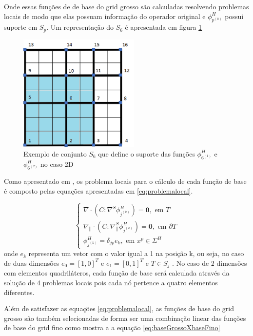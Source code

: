 \documentclass{article}
\begin{document}
Onde essas funções de de base do grid grosso são calculadas resolvendo problemas locais de modo que elas possuam informação do operador original e $\phi^H_{p^{(k)}}$  possui suporte em $S_p$.  Um representação do $S_6$ é apresentada em figura \ref{fig:s6}

\begin{figure}[!htbp]
\label{fig:s6}
\centering
\includegraphics[width=6cm]{figs/S6.png	}
\caption{Exemplo de conjunto $S_6$ que define o suporte das funções  $\phi^H_{6^{(1)}}$ e  $\phi^H_{6^{(2)}}$ no caso 2D}
\end{figure}


Como apresentado em \cite{casteletto}, os problema locais para o cálculo de cada função de base é  composto pelas equações apresentadas em \ref{eq:problemalocal}. 

\begin{equation} \label{eq:problemalocal}
\left\{\begin{matrix}
\nabla \cdotp (C:\nabla ^ S \phi^H_{j^{(k)}}) = \mathbf{0}, \text{   em  } T
\\ 
\nabla_{||} \cdotp (C:\nabla_{||} ^ S \phi^H_{j^{(k)}}) = \mathbf{0}, \text{  em   } \partial T
\\ 
\phi^H_{j^{(k)}} = \delta_{jp} e_k, \text{    em   } x^p \in \Sigma ^ H
\end{matrix}\right.
\end{equation} onde $e_k$ representa um vetor com o valor igual a 1 na posição k, ou seja, no caso de duas dimensões $e_0 = [1, 0]^T$ e $e_1  = [0, 1]^T$ e $T \in S_j$ . No caso de 2 dimensões com elementos quadriláteros, cada função de base será calculada através da solução de 4 problemas locais pois cada nó pertence a quatro elementos diferentes. 

Além de satisfazer as equações \ref{eq:problemalocal}, as funções de base do grid grosso são também selecionadas de forma ser uma combinação linear das funções de base do grid fino como mostra a a equação \ref{eq:baseGrossoXbaseFino}
\end{document}
